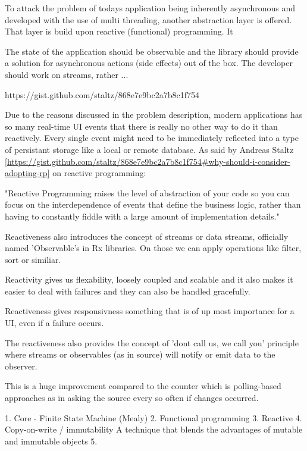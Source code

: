 To attack the problem of todays application being inherently asynchronous and developed with the use of multi threading,
another abstraction layer is offered.
That layer is build upon reactive (functional) programming. It 


The state of the application should be observable and the library should provide
a solution for asynchronous actions (side effects) out of the box. The developer
should work on streams, rather ...

https://gist.github.com/staltz/868e7e9bc2a7b8c1f754




Due to the reasons discussed in the problem description, modern applications has 
so many real-time UI events that there is really no 
other way to do it than reactively. Every single event might need to be immediately
reflected into a type of persistant storage like a local or remote database.
As said by Andreas Staltz \ref{https://gist.github.com/staltz/868e7e9bc2a7b8c1f754#why-should-i-consider-adopting-rp} on
reactive programming:

"Reactive Programming raises the level of abstraction of your code so you can 
focus on the interdependence of events that define the business logic, 
rather than having to constantly fiddle with a large amount of implementation details."

Reactiveness also introduces the concept of streams or data streams, officially named 'Observable's in Rx libraries. On those we can apply operations
like filter, sort or similiar.

Reactivity gives us flexability, loosely coupled and scalable and it also makes it
easier to deal with failures and they can also be handled gracefully.

Reactiveness gives responsivness something that is of up most importance for a
UI, even if a failure occurs.

The reactiveness also provides the concept of 'dont call us, we call you' principle
where streams or observables (as in source) will notify or emit data to the observer.
 
This is a huge improvement compared to the counter which is polling-based approaches
as in asking the source every so often if changes occurred.

1. Core - Finite State Machine (Mealy)
2. Functional programming
3. Reactive
4. Copy-on-write / immutability A technique that blends the advantages of mutable and immutable objects
5.

